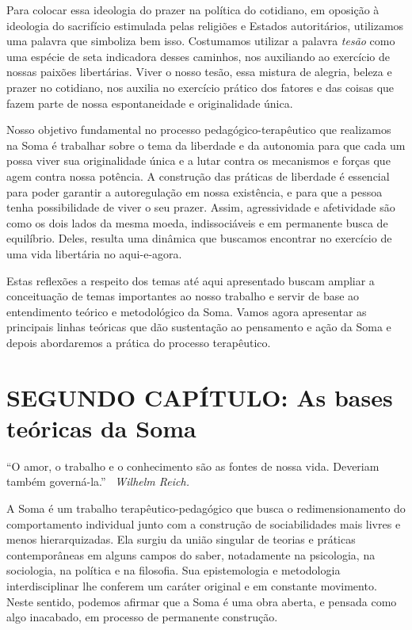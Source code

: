 Para colocar essa ideologia do prazer na política do cotidiano, em
oposição à ideologia do sacrifício estimulada pelas religiões e Estados
autoritários, utilizamos uma palavra que simboliza bem isso. Costumamos
utilizar a palavra \emph{tesão} como uma espécie de seta indicadora
desses caminhos, nos auxiliando ao exercício de nossas paixões
libertárias. Viver o nosso tesão, essa mistura de alegria, beleza e
prazer no cotidiano, nos auxilia no exercício prático dos fatores e das
coisas que fazem parte de nossa espontaneidade e originalidade única.

Nosso objetivo fundamental no processo pedagógico-terapêutico que
realizamos na Soma é trabalhar sobre o tema da liberdade e da autonomia
para que cada um possa viver sua originalidade única e a lutar contra os
mecanismos e forças que agem contra nossa potência. A construção das
práticas de liberdade é essencial para poder garantir a autoregulação em
nossa existência, e para que a pessoa tenha possibilidade de viver o seu
prazer. Assim, agressividade e afetividade são como os dois lados da
mesma moeda, indissociáveis e em permanente busca de equilíbrio. Deles,
resulta uma dinâmica que buscamos encontrar no exercício de uma vida
libertária no aqui-e-agora.

Estas reflexões a respeito dos temas até aqui apresentado buscam ampliar
a conceituação de temas importantes ao nosso trabalho e servir de base
ao entendimento teórico e metodológico da Soma. Vamos agora apresentar
as principais linhas teóricas que dão sustentação ao pensamento e ação
da Soma e depois abordaremos a prática do processo terapêutico.

\chapter{SEGUNDO CAPÍTULO: As bases teóricas da Soma}

``O amor, o trabalho e o conhecimento são as fontes de nossa vida.
Deveriam também governá-la.'' ~\emph{Wilhelm Reich.}

A Soma é um trabalho terapêutico-pedagógico que busca o
redimensionamento do comportamento individual junto com a construção de
sociabilidades mais livres e menos hierarquizadas. Ela surgiu da união
singular de teorias e práticas contemporâneas em alguns campos do saber,
notadamente na psicologia, na sociologia, na política e na filosofia.
Sua epistemologia e metodologia interdisciplinar lhe conferem um caráter
original e em constante movimento. Neste sentido, podemos afirmar que a
Soma é uma obra aberta, e pensada como algo inacabado, em processo de
permanente construção.

